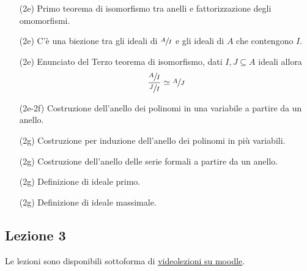 \documentclass[italian]{article}
\begin{document}
    \begin{enumerate}
      \item[(2e)] Primo teorema di isomorfismo tra anelli e fattorizzazione degli 
      	omomorfismi.
      \item[(2e)] C'è una biezione tra gli ideali di $\sfrac{A}{I}$ e gli ideali di $A$ che contengono 
		  $I$.
      \item[(2e)] Enunciato del Terzo teorema di isomorfismo, dati $I, J \subseteq A$ ideali allora
      	\begin{equation*}
      		\dfrac{\sfrac{A}{I}}{\sfrac{J}{I}} \simeq \sfrac{A}{J}
      	\end{equation*}
      \item[(2e-2f)] Costruzione dell'anello dei polinomi in una variabile a partire 
      		da un anello.
      \item[(2g)] Costruzione per induzione dell'anello dei polinomi in più variabili.
      \item[(2g)] Costruzione dell'anello delle serie formali a partire da un anello.
      \item[(2g)] Definizione di ideale primo.
      \item[(2g)] Definizione di ideale massimale.
    \end{enumerate}

    \subsection{Lezione 3}
    Le lezioni sono disponibili sottoforma di 
    \href{https://didatticaonline.unitn.it/dol/course/view.php?id=23268}{videolezioni
    su moodle}.
    
\end{document}
